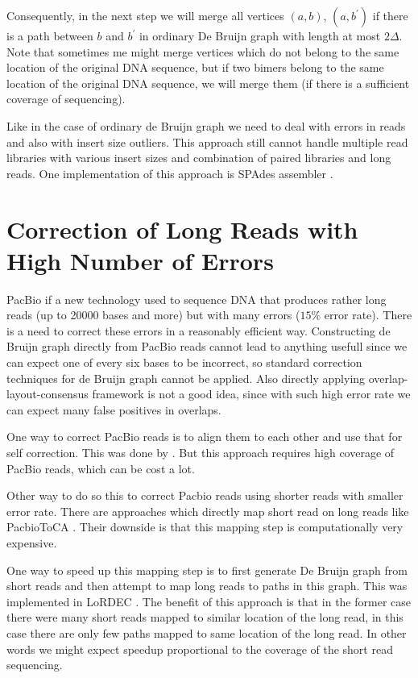 Consequently, in the next step we will merge all vertices $(a, b)$, $(a, b^{'})$ if there is a path
between $b$ and $b^{'}$ in ordinary De Bruijn graph with length at most $2\Delta$.
Note that sometimes me might merge vertices which do not belong to the same location of the original DNA
sequence, but if two bimers belong to the same location of the original DNA sequence, we will merge
them (if there is a sufficient coverage of sequencing).

\bigskip
Like in the case of ordinary de Bruijn graph we need to deal with errors in reads
and also with insert size outliers. This approach still cannot handle multiple
read libraries with various insert sizes and combination of paired libraries and long reads.
One implementation of this approach is SPAdes assembler \citep{Spades}.


\section{Correction of Long Reads with High Number of Errors}

PacBio if a new technology used to sequence DNA that produces
rather long reads (up to 20000 bases and more) but with many errors
($15\%$ error rate). There is a need to correct these errors in a reasonably
efficient way. Constructing de Bruijn graph directly from PacBio reads
cannot lead to anything usefull since we can expect one of every six bases to be
incorrect, so standard correction techniques for de Bruijn graph cannot be applied.
Also directly applying overlap-layout-consensus framework is not a good idea, since
with such high error rate we can expect many false positives in overlaps.

One way to correct PacBio reads is to align them to each other and use that for self correction.
This was done by \citet{MHAP}. But this approach requires high coverage
of PacBio reads, which can be cost a lot.

Other way to do so this to correct Pacbio reads using shorter reads with smaller
error rate. There are approaches which directly map short read on long reads like
PacbioToCA \citep{PacbioToCA}. Their downside is that this mapping step
is computationally very expensive.

One way to speed up this mapping step is to first generate De Bruijn graph from short reads
and then attempt to map long reads to paths in this graph.
This was implemented in LoRDEC \citep{Lordec}.
The benefit of this approach is that in the former
case there were many short reads mapped to similar location of the long read, in this
case there are only few paths mapped to same location of the long read. In other
words we might expect speedup proportional to the coverage of the short read sequencing.

